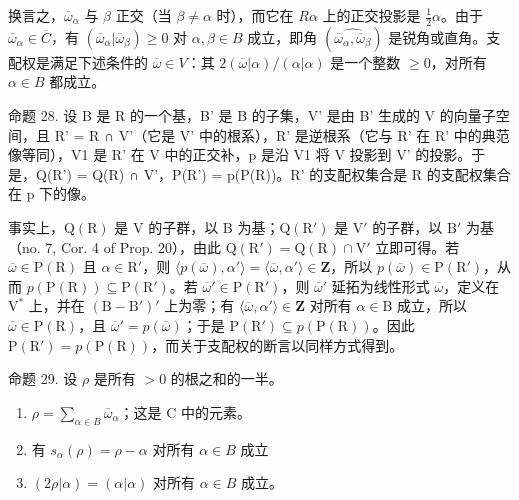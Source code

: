  换言之，\(\overline{\omega}_{\alpha}\) 与 \(\beta\) 正交（当 \(\beta \neq \alpha\) 时），而它在 \(R\alpha\) 上的正交投影是 \(\frac{1}{2}\alpha\)。由于 \(\overline{\omega}_{\alpha} \in \overline{C}\)，有 \((\overline{\omega}_{\alpha} | \overline{\omega}_{\beta}) \geqslant 0\) 对 \(\alpha, \beta \in B\) 成立，即角 \((\widehat{\overline{\omega}_{\alpha}, \overline{\omega}_{\beta}})\) 是锐角或直角。支配权是满足下述条件的 \(\overline{\omega} \in V\)：其 \(2(\overline{\omega} | \alpha)/( \alpha | \alpha)\) 是一个整数 \(\geqslant 0\)，对所有 \(\alpha \in B\) 都成立。

命题 28. 设 B 是 R 的一个基，B' 是 B 的子集，V' 是由 B' 生成的 V 的向量子空间，且 R' = R ∩ V'（它是 V' 中的根系），R' 是逆根系（它与 R' 在 R' 中的典范像等同），V1 是 R' 在 V 中的正交补，p 是沿 V1 将 V 投影到 V' 的投影。于是，Q(R') = Q(R) ∩ V'，P(R') = p(P(R))。R' 的支配权集合是 R 的支配权集合在 p 下的像。

事实上，\(\mathrm{Q}(\mathrm{R})\) 是 \(\mathrm{V}\) 的子群，以 \(\mathrm{B}\) 为基；\(\mathrm{Q}(\mathrm{R}')\) 是 \(\mathrm{V}'\) 的子群，以 \(\mathrm{B}'\) 为基（no. 7, Cor. 4 of Prop. 20），由此 \(\mathrm{Q}(\mathrm{R}') = \mathrm{Q}(\mathrm{R}) \cap \mathrm{V}'\) 立即可得。若 \(\overline{\omega} \in \mathrm{P}(\mathrm{R})\) 且 \(\alpha \in \mathrm{R}'\)，则 \(\langle p(\overline{\omega}), \alpha' \rangle = \langle \overline{\omega}, \alpha' \rangle \in \mathbf{Z}\)，所以 \(p(\overline{\omega}) \in \mathrm{P}(\mathrm{R}')\)，从而 \(p(\mathrm{P}(\mathrm{R})) \subseteq \mathrm{P}(\mathrm{R}')\)。若 \(\overline{\omega}' \in \mathrm{P}(\mathrm{R}')\)，则 \(\overline{\omega}'\) 延拓为线性形式 \(\overline{\omega}\)，定义在 \(\mathrm{V}^*\) 上，并在 \((\mathrm{B} - \mathrm{B}')'\) 上为零；有 \(\langle \overline{\omega}, \alpha' \rangle \in \mathbf{Z}\) 对所有 \(\alpha \in \mathrm{B}\) 成立，所以 \(\overline{\omega} \in \mathrm{P}(\mathrm{R})\)，且 \(\overline{\omega}' = p(\overline{\omega})\)；于是 \(\mathrm{P}(\mathrm{R}') \subseteq p(\mathrm{P}(\mathrm{R}))\)。因此 \(\mathrm{P}(\mathrm{R}') = p(\mathrm{P}(\mathrm{R}))\)，而关于支配权的断言以同样方式得到。

命题 29. 设 \(\rho\) 是所有 \(>0\) 的根之和的一半。

\begin{enumerate}
\def\labelenumi{(\roman{enumi})}
\item
  \(\rho = \sum_{\alpha \in B} \overline{\omega}_{\alpha}\)；这是 C 中的元素。
\item
  有 \(s_{\alpha}(\rho) = \rho -\alpha\) 对所有 \(\alpha \in B\) 成立
\item
  \((2\rho |\alpha) = (\alpha |\alpha)\) 对所有 \(\alpha \in B\) 成立。
\end{enumerate}

